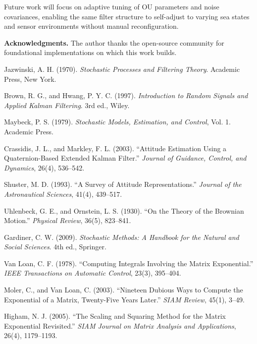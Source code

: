 \documentclass[10pt]{extarticle}
\begin{document}
Future work will focus on adaptive tuning of OU parameters and noise covariances,
enabling the same filter structure to self-adjust to varying sea states and sensor
environments without manual reconfiguration.

\vspace{1em}
\noindent\textbf{Acknowledgments.}  
The author thanks the open-source community for foundational implementations
on which this work builds.

\begin{thebibliography}{99}

Jazwinski, A. H. (1970).  
\emph{Stochastic Processes and Filtering Theory}.  
Academic Press, New York.

Brown, R. G., and Hwang, P. Y. C. (1997).  
\emph{Introduction to Random Signals and Applied Kalman Filtering}.  
3rd ed., Wiley.

Maybeck, P. S. (1979).  
\emph{Stochastic Models, Estimation, and Control}, Vol. 1.  
Academic Press.

Crassidis, J. L., and Markley, F. L. (2003).  
“Attitude Estimation Using a Quaternion-Based Extended Kalman Filter.”  
\emph{Journal of Guidance, Control, and Dynamics}, 26(4), 536–542.

Shuster, M. D. (1993).  
“A Survey of Attitude Representations.”  
\emph{Journal of the Astronautical Sciences}, 41(4), 439–517.

Uhlenbeck, G. E., and Ornstein, L. S. (1930).  
“On the Theory of the Brownian Motion.”  
\emph{Physical Review}, 36(5), 823–841.

Gardiner, C. W. (2009).  
\emph{Stochastic Methods: A Handbook for the Natural and Social Sciences}.  
4th ed., Springer.

Van Loan, C. F. (1978).  
“Computing Integrals Involving the Matrix Exponential.”  
\emph{IEEE Transactions on Automatic Control}, 23(3), 395–404.

Moler, C., and Van Loan, C. (2003).  
“Nineteen Dubious Ways to Compute the Exponential of a Matrix, Twenty-Five Years Later.”  
\emph{SIAM Review}, 45(1), 3–49.

Higham, N. J. (2005).  
“The Scaling and Squaring Method for the Matrix Exponential Revisited.”  
\emph{SIAM Journal on Matrix Analysis and Applications}, 26(4), 1179–1193.


\end{thebibliography}
\end{document}
